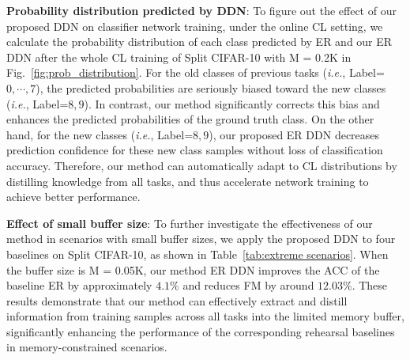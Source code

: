 \documentclass[table, xcdraw]{article}
\theoremstyle{plain}
\theoremstyle{definition}
\theoremstyle{remark}
\begin{document}
\textbf{Probability distribution predicted by DDN}:
To figure out the effect of our proposed DDN on classifier network training, under the online CL setting, we calculate the probability distribution of each class predicted by ER and our ER DDN after the whole CL training of Split CIFAR-10 with M = 0.2K in Fig.~\ref{fig:prob_distribution}. For the old classes of previous tasks (\textit{i.e.}, Label=$0,\cdots, 7$), the predicted probabilities are seriously biased toward the new classes (\textit{i.e.}, Label=$8,9$). In contrast, our method significantly corrects this bias and enhances the predicted probabilities of the ground truth class. On the other hand, for the new classes (\textit{i.e.}, Label=$8,9$), our proposed ER DDN decreases prediction confidence for these new class samples without loss of classification accuracy.
Therefore, our method can automatically adapt to CL distributions by distilling knowledge from all tasks, and thus accelerate network training to achieve better performance.

\textbf{Effect of small buffer size}:
To further investigate the effectiveness of our method in scenarios with small buffer sizes, we apply the proposed DDN to four baselines on Split CIFAR-10, as shown in Table~\ref{tab:extreme scenarios}. When the buffer size is M = 0.05K, our method ER DDN improves the ACC of the baseline ER by approximately $4.1\%$ and reduces FM by around $12.03\%$. These results demonstrate that our method can effectively extract and distill information from training samples across all tasks into the limited memory buffer, significantly enhancing the performance of the corresponding rehearsal baselines in memory-constrained scenarios.
\end{document}
